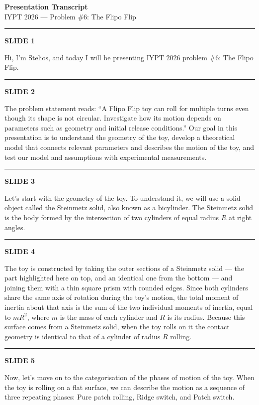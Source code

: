 \documentclass[a4paper,11pt]{article}
\newcommand{\slidetitle}[1]{{\small\textbf{SLIDE #1}}\par\smallskip}
\newcommand{\slidedivider}{\vspace{0.7em}\noindent\rule{\textwidth}{0.4pt}\vspace{0.7em}}
\begin{document}
\begin{center}
  {\large\textbf{Presentation Transcript}}\\[0.3em]
  {\normalsize IYPT 2026 --- Problem \#6: The Flipo Flip}
\end{center}

\vspace{1em}
\noindent\rule{\textwidth}{0.8pt}
\vspace{0.5em}

\slidetitle{1}
Hi, I'm Stelios, and today I will be presenting IYPT 2026 problem \#6: The Flipo Flip.

\slidedivider

\slidetitle{2}
The problem statement reads: ``A Flipo Flip toy can roll for multiple turns even though its shape is not circular. Investigate how its motion depends on parameters such as geometry and initial release conditions.'' Our goal in this presentation is to understand the geometry of the toy, develop a theoretical model that connects relevant parameters and describes the motion of the toy, and test our model and assumptions with experimental measurements.

\slidedivider

\slidetitle{3}
Let's start with the geometry of the toy. To understand it, we will use a solid object called the Steinmetz solid, also known as a bicylinder. The Steinmetz solid is the body formed by the intersection of two cylinders of equal radius $R$ at right angles.

\slidedivider

\slidetitle{4}
The toy is constructed by taking the outer sections of a Steinmetz solid --- the part highlighted here on top, and an identical one from the bottom --- and joining them with a thin square prism with rounded edges. Since both cylinders share the same axis of rotation during the toy's motion, the total moment of inertia about that axis is the sum of the two individual moments of inertia, equal to $mR^2$, where $m$ is the mass of each cylinder and $R$ is its radius. Because this surface comes from a Steinmetz solid, when the toy rolls on it the contact geometry is identical to that of a cylinder of radius $R$ rolling.

\slidedivider

\slidetitle{5}
Now, let's move on to the categorisation of the phases of motion of the toy. When the toy is rolling on a flat surface, we can describe the motion as a sequence of three repeating phases: Pure patch rolling, Ridge switch, and Patch switch.
\end{document}
